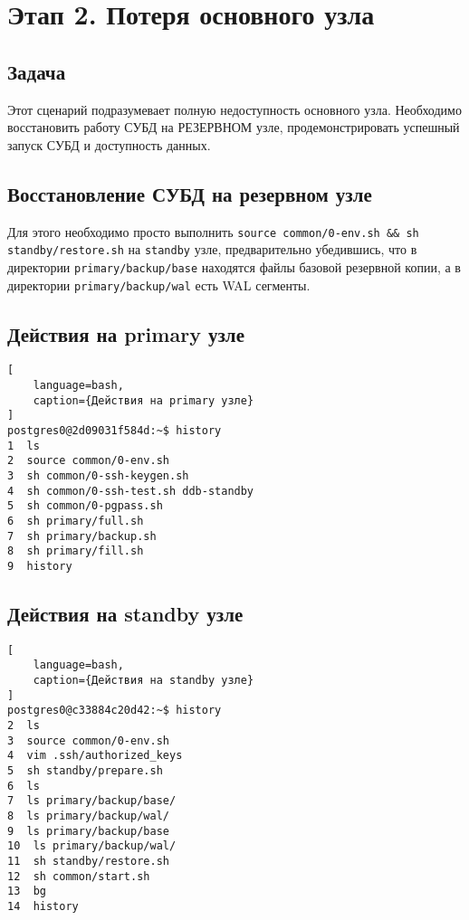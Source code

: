 \documentclass{article}
\begin{document}
\section{Этап 2. Потеря основного узла}

\subsection{Задача}

Этот сценарий подразумевает полную недоступность основного узла. Необходимо восстановить работу СУБД на РЕЗЕРВНОМ узле, продемонстрировать успешный запуск СУБД и доступность данных.

\subsection{Восстановление СУБД на резервном узле}

Для этого необходимо просто выполнить 
\texttt{source common/0-env.sh \&\& sh standby/restore.sh} 
на \texttt{standby} узле, предварительно убедившись, что в 
директории \texttt{primary/backup/base} находятся файлы базовой резервной копии,
а в директории \texttt{primary/backup/wal} есть WAL сегменты.



\subsection{Действия на primary узле}

\begin{lstlisting}[
    language=bash,
    caption={Действия на primary узле}
]
postgres0@2d09031f584d:~$ history
1  ls
2  source common/0-env.sh 
3  sh common/0-ssh-keygen.sh 
4  sh common/0-ssh-test.sh ddb-standby
5  sh common/0-pgpass.sh 
6  sh primary/full.sh 
7  sh primary/backup.sh 
8  sh primary/fill.sh 
9  history
\end{lstlisting}

\subsection{Действия на standby узле}

\begin{lstlisting}[
    language=bash,
    caption={Действия на standby узле}
]
postgres0@c33884c20d42:~$ history
2  ls
3  source common/0-env.sh
4  vim .ssh/authorized_keys 
5  sh standby/prepare.sh 
6  ls
7  ls primary/backup/base/
8  ls primary/backup/wal/
9  ls primary/backup/base
10  ls primary/backup/wal/
11  sh standby/restore.sh 
12  sh common/start.sh 
13  bg
14  history
\end{lstlisting}
\end{document}
